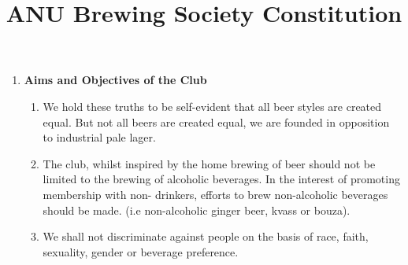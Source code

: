 \documentclass{article}
\title{ANU Brewing Society Constitution}
\author{}
\date{}
\begin{document}
\maketitle

\begin{enumerate}[label=\textbf{\arabic*}]
    \item \textbf{Aims and Objectives of the Club}
    \begin{enumerate}[label=1.\arabic*]
        \item We hold these truths to be self-evident that all beer styles are created equal. But not all beers are created equal, we are founded in opposition to industrial pale lager.
        \item The club, whilst inspired by the home brewing of beer should not be limited to the brewing of alcoholic beverages. In the interest of promoting membership with non- drinkers, efforts to brew non-alcoholic beverages should be made. (i.e non-alcoholic ginger beer, kvass or bouza).
        \item We shall not discriminate against people on the basis of race, faith, sexuality, gender or beverage preference.
    \end{enumerate}


\end{enumerate}
\end{document}

